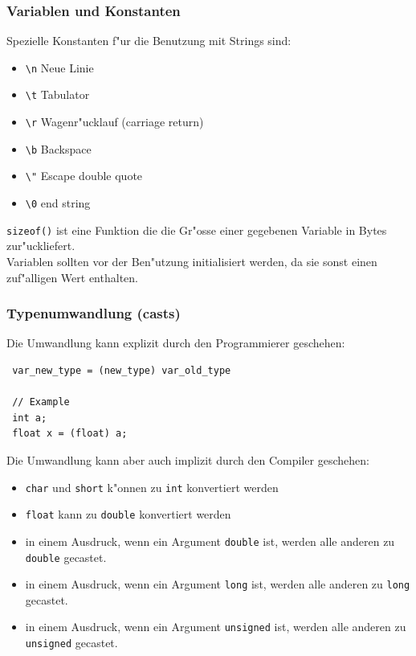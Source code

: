 \documentclass[german, 10pt, a4paper, twocolumn]{scrartcl}
\begin{document}
\subsubsection{Variablen und Konstanten}

Spezielle Konstanten f"ur die Benutzung mit Strings sind:
\begin{itemize}
	\item \verb#\n# Neue Linie
	\item \verb#\t# Tabulator
	\item \verb#\r# Wagenr"ucklauf (carriage return)
	\item \verb#\b# Backspace
	\item \verb#\"# Escape double quote
	\item \verb#\0# end string
\end{itemize}

\verb#sizeof()# ist eine Funktion die die Gr"osse einer gegebenen Variable in Bytes zur"uckliefert.\\

Variablen sollten vor der Ben"utzung initialisiert werden, da sie sonst einen zuf"alligen Wert enthalten.

\subsubsection{Typenumwandlung (casts)}

Die Umwandlung kann explizit durch den Programmierer geschehen:
\begin{verbatim}
 var_new_type = (new_type) var_old_type

 // Example
 int a;
 float x = (float) a;
\end{verbatim}

Die Umwandlung kann aber auch implizit durch den Compiler geschehen:
\begin{itemize}
 \item \verb#char# und \verb#short# k"onnen zu \verb#int# konvertiert werden
 \item \verb#float# kann zu \verb#double# konvertiert werden
 \item in einem Ausdruck, wenn ein Argument \verb#double# ist, werden alle anderen zu \verb#double# gecastet.
 \item in einem Ausdruck, wenn ein Argument \verb#long# ist, werden alle anderen zu \verb#long# gecastet.
 \item in einem Ausdruck, wenn ein Argument \verb#unsigned# ist, werden alle anderen zu \verb#unsigned# gecastet.
\end{itemize}
\end{document}

